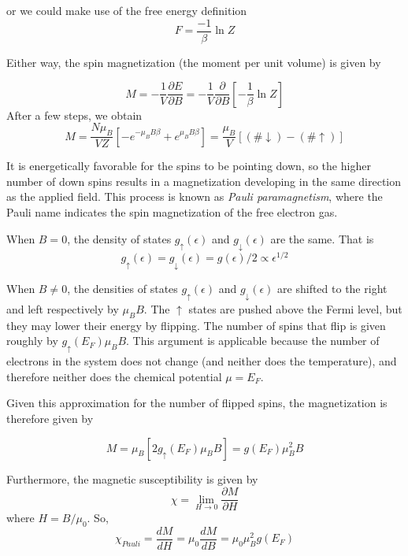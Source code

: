 \documentclass[10pt]{article}
\begin{document}
or we could make use of the free energy definition
$$F = \frac{-1}{\beta}\ln Z$$

Either way, the spin magnetization (the moment per unit volume) is given by

$$
M = -\frac{1}{V}\frac{\partial E}{\partial B} = -\frac{1}{V}\frac{\partial}{\partial B}\left [ -\frac{1}{\beta}\ln Z\right ]
$$
After a few steps, we obtain
$$
M = \frac{N\mu_{B}}{VZ}\left [  -e^{-\mu_{B}B\beta} + e^{\mu_{B}B\beta}\right ] = \frac{\mu_{B}}{V}[(\# \downarrow) - (\# \uparrow)]
$$

It is energetically favorable for the spins to be pointing down, so the higher number of down spins results in a magnetization developing in the same direction
as the applied field. This process is known as \emph{Pauli paramagnetism}, where the Pauli name indicates the spin magnetization of the
free electron gas.

When $B = 0$, the density of states $g_{\uparrow}(\epsilon)$ and $g_{\downarrow}(\epsilon)$ are the same. That is
$$
g_{\uparrow}(\epsilon) = g_{\downarrow}(\epsilon) = g(\epsilon)/2 \propto \epsilon^{1/2}
$$

When $B \neq 0$, the densities of states $g_{\uparrow}(\epsilon)$ and $g_{\downarrow}(\epsilon)$ are shifted to the right and left
respectively by $\mu_{B}B$. The $\uparrow$ states are pushed above the Fermi level, but they may lower their energy by flipping. The number of spins that
flip is given roughly by $g_{\uparrow}(E_{F})\mu_{B}B$. This argument is applicable because the number of electrons in the system does not change (and neither does
the temperature), and therefore neither does the chemical potential $\mu = E_{F}$.

Given this approximation for the number of flipped spins, the magnetization is therefore given by

$$
M = \mu_{B}[2g_{\uparrow}(E_{F})\mu_{B}B] = g(E_{F})\mu_{B}^{2}B
$$

Furthermore, the magnetic susceptibility is given by
$$
\chi = \lim_{H \rightarrow 0}\frac{\partial M}{\partial H}
$$
where $H = B/\mu_{0}$. So,
$$
\chi_{Pauli} = \frac{dM}{dH} = \mu_{0}\frac{dM}{dB} = \mu_{0}\mu_{B}^{2}g(E_{F})
$$
\end{document}

